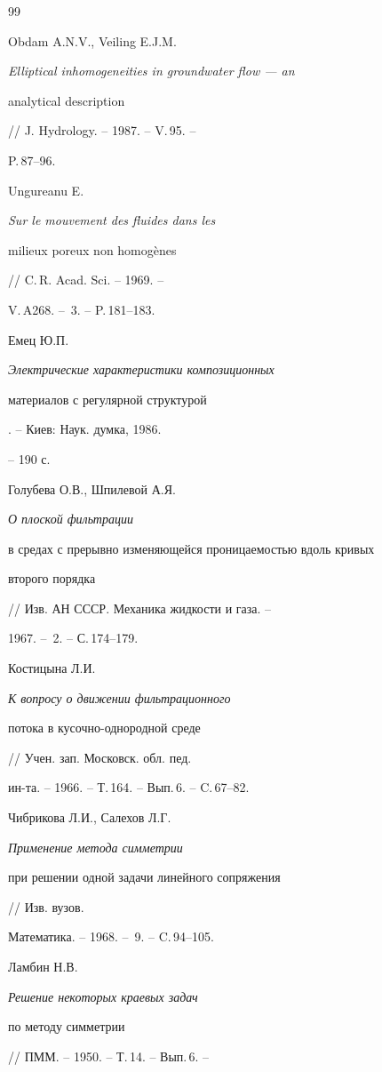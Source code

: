 \begin{thebibliography}{99}







Obdam A.N.V., Veiling E.J.M.


{\em Elliptical inhomogeneities in groundwater flow --- an


analytical description} // J. Hydrology. -- 1987. -- V.\,95. --


P.\,87--96.




Ungureanu E. {\em Sur le mouvement des fluides dans les


milieux poreux non homog\`enes} // C.\,R. Acad. Sci. -- 1969. --


V.\,A268. -- \No\,3. -- P.\,181--183.




Емец Ю.П. {\em Электрические характеристики композиционных


материалов с регулярной структурой}. -- Киев: Наук. думка, 1986.


-- 190 с.




Голубева О.В., Шпилевой А.Я. {\em О плоской фильтрации


в средах с прерывно изменяющейся проницаемостью вдоль кривых


второго порядка} // Изв. АН СССР. Механика жидкости и газа. --


1967. -- \No\,2. -- С.\,174--179.




Костицына Л.И. {\em К вопросу о движении фильтрационного


потока в кусочно-однородной среде} // Учен. зап. Московск. обл. пед.


ин-та. -- 1966. -- Т.\,164. -- Вып.\,6. -- C.\,67--82.




Чибрикова Л.И., Салехов Л.Г. {\em Применение метода симметрии


при решении одной задачи линейного сопряжения} // Изв. вузов.


Математика. -- 1968. -- \No\,9. -- C.\,94--105.




Ламбин Н.В. {\em Решение некоторых краевых задач


по методу симметрии} // ПММ. -- 1950. -- Т.\,14. -- Вып.\,6. --



\end{thebibliography}
